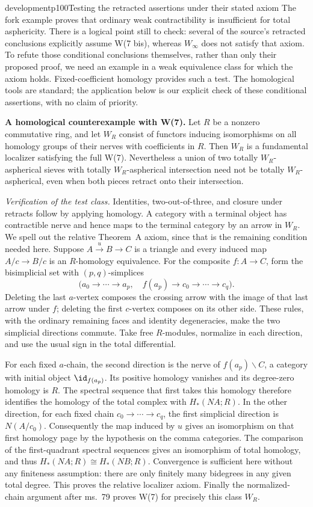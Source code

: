 \begin{dcomment}{development}{p100}{Testing the retracted assertions under their stated axiom}
The fork example proves that ordinary weak contractibility is insufficient for total asphericity. There is a logical point still to check: several of the source's retracted conclusions explicitly assume W(7 bis), whereas $W_\infty$ does not satisfy that axiom. To refute those conditional conclusions themselves, rather than only their proposed proof, we need an example in a weak equivalence class for which the axiom holds. Fixed-coefficient homology provides such a test. The homological tools are standard; the application below is our explicit check of these conditional assertions, with no claim of priority.

\textbf{A homological counterexample with W(7).}\ours\quad
Let $R$ be a nonzero commutative ring, and let $W_R$ consist of functors inducing isomorphisms on all homology groups of their nerves with coefficients in $R$. Then $W_R$ is a fundamental localizer satisfying the full W(7). Nevertheless a union of two totally $W_R$-aspherical sieves with totally $W_R$-aspherical intersection need not be totally $W_R$-aspherical, even when both pieces retract onto their intersection.

\emph{Verification of the test class.} Identities, two-out-of-three, and closure under retracts follow by applying homology. A category with a terminal object has contractible nerve and hence maps to the terminal category by an arrow in $W_R$. We spell out the relative Theorem~A axiom, since that is the remaining condition needed here. Suppose $A\xrightarrow{u}B\to C$ is a triangle and every induced map $A/c\to B/c$ is an $R$-homology equivalence. For the composite $f:A\to C$, form the bisimplicial set with $(p,q)$-simplices
\[
 \bigl(a_0\to\cdots\to a_p,\quad
       f(a_p)\to c_0\to\cdots\to c_q\bigr).
\]
Deleting the last $a$-vertex composes the crossing arrow with the image of that last arrow under $f$; deleting the first $c$-vertex composes on its other side. These rules, with the ordinary remaining faces and identity degeneracies, make the two simplicial directions commute. Take free $R$-modules, normalize in each direction, and use the usual sign in the total differential.

For each fixed $a$-chain, the second direction is the nerve of $f(a_p)\backslash C$, a category with initial object $\id_{f(a_p)}$. Its positive homology vanishes and its degree-zero homology is $R$. The spectral sequence that first takes this homology therefore identifies the homology of the total complex with $H_*(NA;R)$. In the other direction, for each fixed chain $c_0\to\cdots\to c_q$, the first simplicial direction is $N(A/c_0)$. Consequently the map induced by $u$ gives an isomorphism on that first homology page by the hypothesis on the comma categories. The comparison of the first-quadrant spectral sequences gives an isomorphism of total homology, and thus $H_*(NA;R)\cong H_*(NB;R)$. Convergence is sufficient here without any finiteness assumption: there are only finitely many bidegrees in any given total degree. This proves the relative localizer axiom. Finally the normalized-chain argument after ms.~79 proves W(7) for precisely this class $W_R$.


\end{dcomment}
